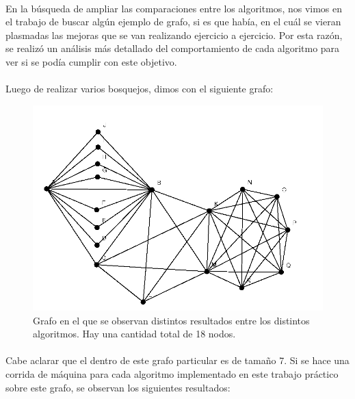 \paragraph{}
En la búsqueda de ampliar las comparaciones entre los algoritmos, nos vimos en el trabajo de buscar algún ejemplo de grafo, si es que había, en el cuál se vieran plasmadas las mejoras que se van realizando ejercicio a ejercicio. Por esta razón, se realizó un análisis más detallado del comportamiento de cada algoritmo para ver si se podía cumplir con este objetivo.

\paragraph{}
Luego de realizar varios bosquejos, dimos con el siguiente grafo:

\vspace*{1cm}

\begin{figure}[htb]
  \includegraphics[scale=0.6]{./otros/pruebaDeMejoras.jpg}
  \caption{Grafo en el que se observan distintos resultados entre los distintos algoritmos. Hay una cantidad total de 18 nodos.}
  \label{pruebademejoras}
\end{figure}

\vspace*{2cm}

\paragraph{}
Cabe aclarar que el \mc dentro de este grafo particular es de tamaño 7. Si se hace una corrida de máquina para cada algoritmo implementado en este trabajo práctico sobre este grafo, se observan los siguientes resultados:


